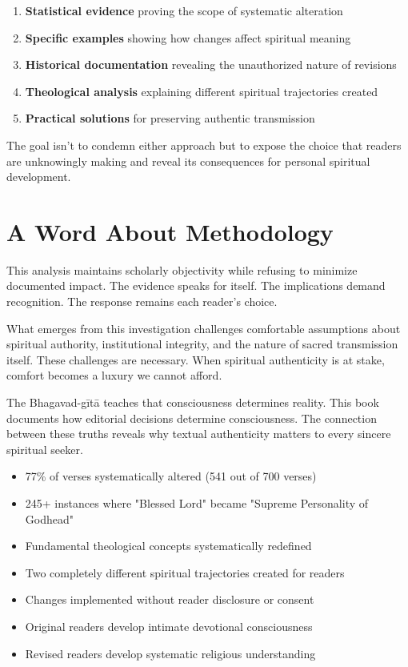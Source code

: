 \documentclass[11pt,twoside]{book}
\begin{document}
\begin{enumerate}
\item \textbf{\textbf{Statistical evidence}} proving the scope of systematic alteration
\item \textbf{\textbf{Specific examples}} showing how changes affect spiritual meaning
\item \textbf{\textbf{Historical documentation}} revealing the unauthorized nature of revisions
\item \textbf{\textbf{Theological analysis}} explaining different spiritual trajectories created
\item \textbf{\textbf{Practical solutions}} for preserving authentic transmission
\end{enumerate}

The goal isn't to condemn either approach but to expose the choice that readers are unknowingly making and reveal its consequences for personal spiritual development.
\section*{A Word About Methodology}
\label{sec:orgd518983}

This analysis maintains scholarly objectivity while refusing to minimize documented impact. The evidence speaks for itself. The implications demand recognition. The response remains each reader's choice.

What emerges from this investigation challenges comfortable assumptions about spiritual authority, institutional integrity, and the nature of sacred transmission itself. These challenges are necessary. When spiritual authenticity is at stake, comfort becomes a luxury we cannot afford.

The Bhagavad-gītā teaches that consciousness determines reality. This book documents how editorial decisions determine consciousness. The connection between these truths reveals why textual authenticity matters to every sincere spiritual seeker.

\begin{itemize}
\item 77\% of verses systematically altered (541 out of 700 verses)

\item 245+ instances where "Blessed Lord" became "Supreme Personality of Godhead"

\item Fundamental theological concepts systematically redefined

\item Two completely different spiritual trajectories created for readers

\item Changes implemented without reader disclosure or consent

\item Original readers develop intimate devotional consciousness

\item Revised readers develop systematic religious understanding
\end{itemize}
\end{document}

